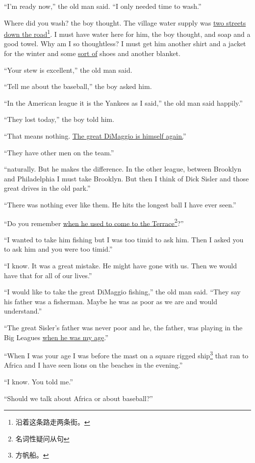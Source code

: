 \documentclass[fontset=ubuntu,zihao=-4]{ctexrep}
\begin{document}
``I'm ready now,'' the old man said. ``I only needed time to wash.''

Where did you wash? the boy thought. The village water \gls{supply} was
\uline{two streets down the road}\footnote{沿着这条路走两条街。}. I must have water here for him, the boy
thought, and \gls{soap} and a good \gls{towel}. Why am I so
\gls{thoughtless}? I must get him another shirt and a jacket for the winter
and some \uline{sort of} shoes and another blanket.

``Your stew is excellent,'' the old man said.

``Tell me about the baseball,'' the boy asked him.

``In the American \Gls{league} it is the Yankees as I said,'' the old man said happily.''

``They lost today,'' the boy told him.

``That means nothing. \uline{The great DiMaggio is himself again.}''

``They have other men on the team.''

``\Gls{naturally}. But he makes the difference. In the other league, between
Brooklyn and Philadelphia I must take Brooklyn. But then I think of Dick
Sisler and those great drives in the old park.''

``There was nothing ever like them. He hits the longest ball I have ever seen.''

``Do you remember \uline{when he used to come to the Terrace}\footnote{名词性疑问从句}?''

``I wanted to take him fishing but I was too \gls{timid} to ask him. Then I
asked you to ask him and you were too timid.''

``I know. It was a great \gls{mistake}. He might have gone with us. Then we
would have that for all of our lives.''

``I would like to take the great DiMaggio fishing,'' the old man said.
``They say his father was a fisherman. Maybe he was as poor as we are and
would understand.''

``The great Sisler's father was never poor and he, the father, was playing
in the Big Leagues \uline{when he was my age}.''

``When I was your age I was before the mast on a \gls{square}
  \gls{rigged} ship\footnote{方帆船。} that ran to Africa and I have seen
lions on the beaches in the evening.''

``I know. You told me.''

``Should we talk about Africa or about baseball?''
\end{document}
